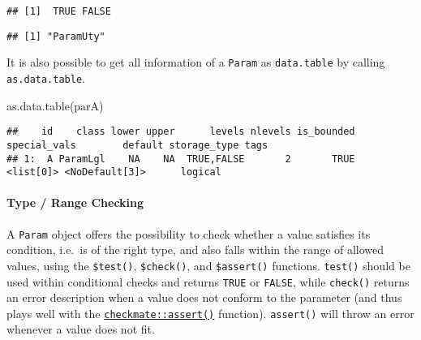 \documentclass[
]{scrbook}
\newenvironment{Shaded}{\begin{snugshade}}{\end{snugshade}}
\newcommand{\ConstantTok}[1]{\textcolor[rgb]{0.00,0.00,0.00}{#1}}
\newcommand{\FunctionTok}[1]{\textcolor[rgb]{0.00,0.00,0.00}{#1}}
\newcommand{\NormalTok}[1]{#1}
\newcommand{\SpecialCharTok}[1]{\textcolor[rgb]{0.00,0.00,0.00}{#1}}
\renewenvironment{Shaded} {\begin{snugshade}\small} {\end{snugshade}}
\begin{document}
\begin{verbatim}
## [1]  TRUE FALSE
\end{verbatim}

\begin{Shaded}
\end{Shaded}

\begin{verbatim}
## [1] "ParamUty"
\end{verbatim}

It is also possible to get all information of a \texttt{Param} as \texttt{data.table} by calling \texttt{as.data.table}.

\begin{Shaded}
\begin{Highlighting}[]
\FunctionTok{as.data.table}\NormalTok{(parA)}
\end{Highlighting}
\end{Shaded}

\begin{verbatim}
##    id    class lower upper      levels nlevels is_bounded special_vals        default storage_type tags
## 1:  A ParamLgl    NA    NA  TRUE,FALSE       2       TRUE    <list[0]> <NoDefault[3]>      logical
\end{verbatim}

\hypertarget{type-range-checking}{%
\paragraph{Type / Range Checking}\label{type-range-checking}}

A \texttt{Param} object offers the possibility to check whether a value satisfies its condition, i.e.~is of the right type, and also falls within the range of allowed values, using the \texttt{\$test()}, \texttt{\$check()}, and \texttt{\$assert()} functions.
\texttt{test()} should be used within conditional checks and returns \texttt{TRUE} or \texttt{FALSE}, while \texttt{check()} returns an error description when a value does not conform to the parameter (and thus plays well with the \href{https://www.rdocumentation.org/packages/checkmate/topics/assert}{\texttt{checkmate::assert()}} function).
\texttt{assert()} will throw an error whenever a value does not fit.

\begin{Shaded}
\end{Shaded}
\end{document}
